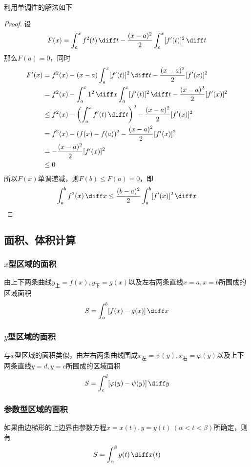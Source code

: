 利用单调性的解法如下
\begin{proof}
    设
    \[ F(x) = \int_a^xf^2(t)\,\diff t - \frac{(x-a)^2}{2}\int_a^x[f'(t)]^2\,\diff t \]
    那么$F(a)=0$，同时
    \begin{align*}
        F'(x)
         & = f^2(x) - (x-a)\int_a^x[f'(t)]^2\,\diff t - \frac{(x-a)^2}{2}[f'(x)]^2                 \\
         & = f^2(x) - \int_a^x 1^2\,\diff x\int_a^x[f'(t)]^2\,\diff t - \frac{(x-a)^2}{2}[f'(x)]^2 \\
         & \leq f^2(x) - \left(\int_a^xf'(t)\,\diff t\right)^2 - \frac{(x-a)^2}{2}[f'(x)]^2        \\
         & =f^2(x) - (f(x)-f(a))^2 - \frac{(x-a)^2}{2}[f'(x)]^2                                    \\
         & =- \frac{(x-a)^2}{2}[f'(x)]^2                                                           \\
         & \leq 0
    \end{align*}
    所以$F(x)$单调递减，则$F(b) \leq F(a) = 0$，即
    \[ \int_a^b f^2(x)\,\diff x \leq \frac{(b-a)^2}{2}\int_a^b[f'(x)]^2\,\diff x \]
\end{proof}

\subsection{面积、体积计算}
\subsubsection{\texorpdfstring{$x$}{x}型区域的面积}
由上下两条曲线$y_\text{上}=f(x),y_\text{下}=g(x)$以及左右两条直线$x=a,x=b$所围成的区域面积
\[ S = \int_a^b [f(x)-g(x)]\,\diff x \]

\subsubsection{\texorpdfstring{$y$}{x}型区域的面积}
与$x$型区域的面积类似，由左右两条曲线围成$x_\text{左}=\psi(y),x_\text{右}=\varphi(y)$以及上下两条直线$y=d,y=c$所围成的区域面积
\[ S = \int_c^d [\varphi(y)-\psi(y)]\,\diff y \]

\subsubsection{参数型区域的面积}
如果曲边梯形的上边界由参数方程$x=x(t),y=y(t)\ (\alpha<t<\beta)$所确定，则有
\[ S = \int_\alpha^\beta y(t)\,\diff x(t) \]

